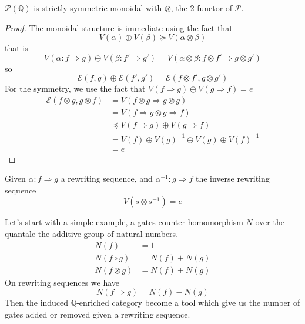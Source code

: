 \documentclass[a4paper]{article}
\begin{document}
\begin{proposition}
  $\mathcal{P}(\mathbb{Q})$ is strictly symmetric monoidal with $\otimes$, the
    2-functor of $\mathcal{P}$.
  
  \begin{proof}
    The monoidal structure is immediate using the fact that
    \[
      V(\alpha) \oplus V(\beta) \succeq V(\alpha \otimes \beta)
    \]
    that is
    \[
      V(\alpha: f \Rightarrow g) \oplus V(\beta: f' \Rightarrow g') = V(\alpha
        \otimes \beta: f \otimes f' \Rightarrow g \otimes g')
    \]
    so
    \[
      \mathcal{E}(f, g) \oplus \mathcal{E}(f', g') = \mathcal{E}(f \otimes f', g
        \otimes g')
    \]
    For the symmetry, we use the fact that $V(f \Rightarrow g) \oplus V(g
      \Rightarrow f) = e$
    \begin{align}
      \mathcal{E}(f \otimes g, g \otimes f) &= V(f \otimes g \Rightarrow g
        \otimes g) \\
      &= V(f \Rightarrow g \otimes g \Rightarrow f) \\
      &\preceq V(f \Rightarrow g) \oplus V(g \Rightarrow f) \\
      &= V(f) \oplus V(g)^{-1} \oplus V(g) \oplus V(f)^{-1} \\
      &= e
    \end{align}
  \end{proof}
\end{proposition}

\begin{corollary}
  Given $\alpha: f \Rightarrow g$ a rewriting sequence, and $\alpha^{-1}: g
    \Rightarrow f$ the inverse rewriting sequence
  \[
    V(s \otimes s^{-1}) = e
  \]
\end{corollary}

\begin{example}
  Let's start with a simple example, a gates counter homomorphism $N$ over the
    quantale the additive group of natural numbers.
  \begin{align*}
    N(f) & = 1 \\
    N(f \circ g) &= N(f) + N(g) \\
    N(f \otimes g) &= N(f) + N(g)
  \end{align*}
  On rewriting sequences we have
  \[
    N(f \Rightarrow g) = N(f) - N(g)
  \]
  Then the induced $\mathbb{Q}$-enriched category become a tool which give us
    the number of gates added or removed given a rewriting sequence.
\end{example}
\end{document}
